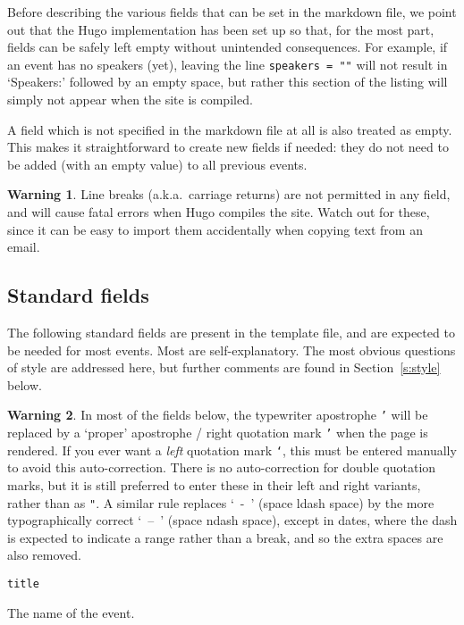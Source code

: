 \documentclass[12pt]{scrartcl}
\theoremstyle{definition}
\newtheorem*{warn}{Warning}
\begin{document}
Before describing the various fields that can be set in the markdown file, we point out that the Hugo implementation has been set up so that, for the most part, fields can be safely left empty without unintended consequences.
For example, if an event has no speakers (yet), leaving the line \verb|speakers = ""|  will not result in `Speakers:' followed by an empty space, but rather this section of the listing will simply not appear when the site is compiled.

A field which is not specified in the markdown file at all is also treated as empty. This makes it straightforward to create new fields if needed: they do not need to be added (with an empty value) to all previous events.

\begin{warn}
Line breaks (a.k.a.\ carriage returns) are not permitted in any field, and will cause fatal errors when Hugo compiles the site.
Watch out for these, since it can be easy to import them accidentally when copying text from an email.
\end{warn}

\subsection{Standard fields}
\label{s:standard_fields}
The following standard fields are present in the template file, and are expected to be needed for most events.
Most are self-explanatory.
The most obvious questions of style are addressed here, but further comments are found in Section~\ref{s:style} below.

\begin{warn}
In most of the fields below, the typewriter apostrophe \texttt{'} will be replaced by a `proper' apostrophe / right quotation mark \texttt{’} when the page is rendered. If you ever want a \emph{left} quotation mark \texttt{‘}, this must be entered manually to avoid this auto-correction.
There is no auto-correction for double quotation marks, but it is still preferred to enter these in their left and right variants, rather than as \texttt{"}.
A similar rule replaces `~-~' (space ldash space) by the more typographically correct `~--~' (space ndash space), except in dates, where the dash is expected to indicate a range rather than a break, and so the extra spaces are also removed.
\end{warn}

\noindent\verb|title|\nopagebreak

The name of the event.
\medskip
\end{document}
